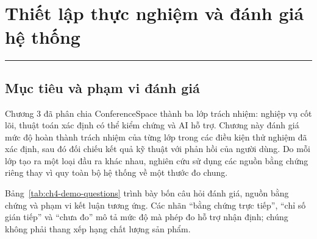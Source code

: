 \chapter{Thiết lập thực nghiệm và đánh giá hệ thống}
\label{Chapter4DemoAppendix}

\par\noindent\rule{\textwidth}{0.4pt}\par

\section{Mục tiêu và phạm vi đánh giá}

Chương 3 đã phân chia ConferenceSpace thành ba lớp trách nhiệm: nghiệp vụ cốt lõi, thuật toán xác định có thể kiểm chứng và AI hỗ trợ. Chương này đánh giá mức độ hoàn thành trách nhiệm của từng lớp trong các điều kiện thử nghiệm đã xác định, sau đó đối chiếu kết quả kỹ thuật với phản hồi của người dùng. Do mỗi lớp tạo ra một loại đầu ra khác nhau, nghiên cứu sử dụng các nguồn bằng chứng riêng thay vì quy toàn bộ hệ thống về một thước đo chung.

Bảng~\ref{tab:ch4-demo-questions} trình bày bốn câu hỏi đánh giá, nguồn bằng chứng và phạm vi kết luận tương ứng. Các nhãn ``bằng chứng trực tiếp'', ``chỉ số gián tiếp'' và ``chưa đo'' mô tả mức độ mà phép đo hỗ trợ nhận định; chúng không phải thang xếp hạng chất lượng sản phẩm.

